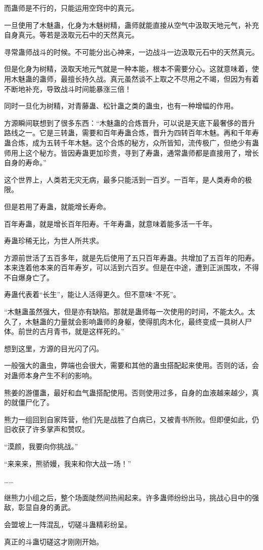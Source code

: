 \begin{this_body}
而蛊师是不行的，只能运用空窍中的真元。

一旦使用了木魅蛊，化身为木魅树精，蛊师就能直接从空气中汲取天地元气，补充自身真元。等若是汲取元石中的天然真元。

寻常蛊师战斗的时候。不可能分出心神来，一边战斗一边汲取元石中的天然真元。

但是化身为树精，汲取天地元气就是一种本能，根本不需要分心。这就意味着，使用木魅蛊的蛊师，最擅长持久战。真元虽然谈不上取之不尽用之不竭，但因为有着不断地补充，导致战斗时间能暴涨三倍！

同时一旦化为树精，对青藤蛊、松针蛊之类的蛊虫，也有一种增幅的作用。

方源瞬间联想到了很多东西：“木魅蛊的合炼晋升，可以说是天底下最奢侈的晋升路线之一。它是三转蛊，需要和百年寿蛊合炼，晋升为四转百年木魅。再和千年寿蛊合炼，成为五转千年木魅。这个合炼的秘方，众所皆知，流传极广，但绝少有蛊师用上这个秘方。皆因寿蛊更加珍贵，寻到了寿蛊，通常蛊师都是直接用了，增长自身的寿命。”

这个世界上，人类若无灾无病，最多只能活到一百岁。一百年，是人类寿命的极限。

但是若用了寿蛊，就能增长寿命。

百年寿蛊，就是增长百年阳寿。千年寿蛊，就意味着能多活一千年。

寿蛊珍稀无比，为世人所共求。

方源前世活了五百多年，就是先后使用了五只百年寿蛊。共增加了五百年的阳寿。本来连着他本来的百年寿岁，可以活到六百岁。但是在中途，遭到正派围攻，不得不自爆身亡了。

寿蛊代表着“长生”，能让人活得更久。但不意味“不死”。

“木魅蛊虽然强大，但是亦有缺陷。那就是蛊师每一次使用的时间，不能太久。太久了，木魅蛊的力量就会影响蛊师的身躯，使得肌肉木化，最终变成一具树人尸体。前世的古月青书，就是这样死的。”

想到这里，方源的目光闪了闪。

一般强大的蛊虫，弊端也会很大，需要和其他的蛊虫搭配起来使用。否则的话，会对蛊师本身产生不利的影响。

熊姜的游僵蛊，最好和血气蛊搭配使用。否则使用过多，自身的血液越来越少，真的就僵尸化了。

熊力一组回到自家阵营，他们先是战胜了白病已，又被青书所败。但即便如此，仍旧收获了许多掌声和赞叹。

“漠颜，我要向你挑战。”

“来来来，熊骄嫚，我来和你大战一场！”

……

继熊力小组之后，整个场面陡然间热闹起来。许多蛊师纷纷出马，挑战心目中的强敌，彰显自身的勇武。

会盟坡上一阵混乱，切磋斗蛊精彩纷呈。

真正的斗蛊切磋这才刚刚开始。

\end{this_body}

